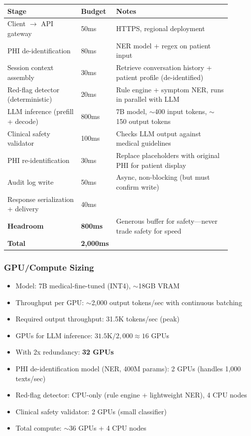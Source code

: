 \begin{tabular}{|p{0.32\linewidth}|p{0.08\linewidth}|p{0.5\linewidth}|}
\hline
\textbf{Stage} & \textbf{Budget} & \textbf{Notes} \\
\hline
Client $\rightarrow$ API gateway & 50ms & HTTPS, regional deployment \\
\hline
PHI de-identification & 80ms & NER model + regex on patient input \\
\hline
Session context assembly & 30ms & Retrieve conversation history + patient profile (de-identified) \\
\hline
Red-flag detector (deterministic) & 20ms & Rule engine + symptom NER, runs in parallel with LLM \\
\hline
LLM inference (prefill + decode) & 800ms & 7B model, $\sim$400 input tokens, $\sim$150 output tokens \\
\hline
Clinical safety validator & 100ms & Checks LLM output against medical guidelines \\
\hline
PHI re-identification & 30ms & Replace placeholders with original PHI for patient display \\
\hline
Audit log write & 50ms & Async, non-blocking (but must confirm write) \\
\hline
Response serialization + delivery & 40ms & \\
\hline
\textbf{Headroom} & \textbf{800ms} & Generous buffer for safety---never trade safety for speed \\
\hline
\textbf{Total} & \textbf{2,000ms} & \\
\hline
\end{tabular}

\subsubsection*{GPU/Compute Sizing}
\begin{itemize}
  \item Model: 7B medical-fine-tuned (INT4), $\sim$18GB VRAM
  \item Throughput per GPU: $\sim$2,000 output tokens/sec with continuous batching
  \item Required output throughput: 31.5K tokens/sec (peak)
  \item GPUs for LLM inference: $31.5\text{K} / 2{,}000 \approx 16$ GPUs
  \item With 2x redundancy: \textbf{32 GPUs}
  \item PHI de-identification model (NER, 400M params): 2 GPUs (handles 1,000 texts/sec)
  \item Red-flag detector: CPU-only (rule engine + lightweight NER), 4 CPU nodes
  \item Clinical safety validator: 2 GPUs (small classifier)
  \item Total compute: $\sim$36 GPUs + 4 CPU nodes
\end{itemize}

